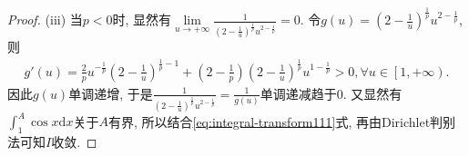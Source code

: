 \documentclass[../../main.tex]{subfiles}%
\begin{document}
\begin{proof}
(iii) 当$p<0$时, 显然有$\underset{u\rightarrow +\infty}{\lim}\frac{1}{\left( 2-\frac{1}{u} \right) ^{\frac{1}{p}}u^{2-\frac{1}{p}}}=0$. 令$g\left( u \right) =\left( 2-\frac{1}{u} \right) ^{\frac{1}{p}}u^{2-\frac{1}{p}}$, 则
\begin{align*}
g'\left( u \right) =\frac{2}{p}u^{-\frac{1}{p}}\left( 2-\frac{1}{u} \right) ^{\frac{1}{p}-1}+\left( 2-\frac{1}{p} \right) \left( 2-\frac{1}{u} \right) ^{\frac{1}{p}}u^{1-\frac{1}{p}}>0,\forall u\in \left[ 1,+\infty \right).
\end{align*}
因此$g\left( u \right)$单调递增, 于是$\frac{1}{\left( 2-\frac{1}{u} \right) ^{\frac{1}{p}}u^{2-\frac{1}{p}}}=\frac{1}{g\left( u \right)}$单调递减趋于$0$. 又显然有$\int_1^A{\cos x\mathrm{d}x}$关于$A$有界, 所以结合\eqref{eq:integral-transform111}式, 再由Dirichlet判别法可知$I$收敛.
\end{proof}
\end{document}
